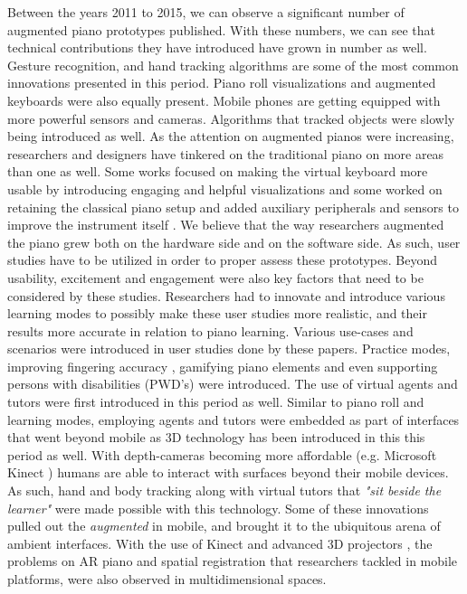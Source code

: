 \documentclass[sigconf, screen, review]{acmart}
\begin{document}
Between the years 2011 to 2015, we can observe a significant number of augmented piano prototypes published. With these numbers, we can see that technical contributions they have introduced have grown in number as well. Gesture recognition, and hand tracking algorithms are some of the most common innovations presented in this period. Piano roll visualizations and augmented keyboards were also equally present. Mobile phones are getting equipped with more powerful sensors and cameras. Algorithms that tracked objects were slowly being introduced as well. As the attention on augmented pianos were increasing, researchers and designers have tinkered on the traditional piano on more areas than one as well. Some works focused on making the virtual keyboard more usable by introducing engaging and helpful visualizations \cite{huang2011piano, xiao2011duet, xiao2013mirrorfugue, xiao2014andante, weing2013piano, chow2013music} and some worked on retaining the classical piano setup and added auxiliary peripherals and sensors to improve the instrument itself \cite{mcpherson2013portable, mcpherson2015buttons, takegawa2012piano, oka2013marker, goodwin2013key, fontana2015designing, dahlstedt2015mapping}. We believe that the way researchers augmented the piano grew both on the hardware side and on the software side. As such, user studies have to be utilized in order to proper assess these prototypes. Beyond usability, excitement and engagement were also key factors that need to be considered by these studies. Researchers had to innovate and introduce various learning modes to possibly make these user studies more realistic, and their results more accurate in relation to piano learning. Various use-cases and scenarios were introduced in user studies done by these papers. Practice modes, improving fingering accuracy \cite{goodwin2013key, xiao2011duet}, gamifying piano elements \cite{weing2013piano,raymaekers2014game} and even supporting persons with disabilities (PWD's) \cite{chouvatut2013virtual} were introduced. The use of virtual agents and tutors were first introduced in this period as well. Similar to piano roll and learning modes, employing agents and tutors were embedded as part of interfaces that went beyond mobile as 3D technology has been introduced in this this period as well. With depth-cameras becoming more affordable (e.g. Microsoft Kinect \cite{zhang2012microsoft}) humans are able to interact with surfaces beyond their mobile devices. As such, hand and body tracking along with virtual tutors that \textit{"sit beside the learner"} were made possible with this technology. Some of these innovations pulled out the \textit{augmented} in mobile, and brought it to the ubiquitous arena of ambient interfaces. With the use of Kinect and advanced 3D projectors \cite{yang2012augmented}, the problems on AR piano and spatial registration that researchers tackled in mobile platforms, were also observed in multidimensional spaces. 
\end{document}
